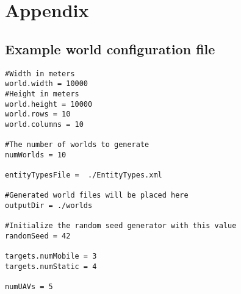 \chapter{Appendix}


\section{Example world configuration file}
\label{sec:exampleWorldCfg}
\begin{verbatim}
#Width in meters
world.width = 10000
#Height in meters
world.height = 10000
world.rows = 10
world.columns = 10

#The number of worlds to generate
numWorlds = 10

entityTypesFile =  ./EntityTypes.xml

#Generated world files will be placed here
outputDir = ./worlds

#Initialize the random seed generator with this value
randomSeed = 42

targets.numMobile = 3
targets.numStatic = 4

numUAVs = 5
\end{verbatim}
